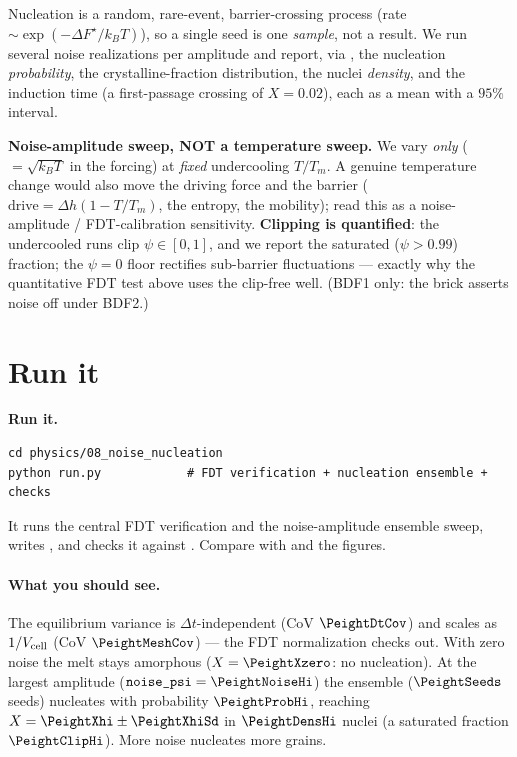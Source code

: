 Nucleation is a random, rare-event, barrier-crossing process (rate
$\sim\exp(-\Delta F^\star/k_BT)$), so a single seed is one \emph{sample},
not a result. We run several noise realizations per amplitude and report,
via , the nucleation
\emph{probability}, the crystalline-fraction distribution, the nuclei
\emph{density}, and the induction time (a first-passage crossing of
$X=0.02$), each as a mean with a $95\%$ interval.

\begin{keybox}
\textbf{Noise-amplitude sweep, NOT a temperature sweep.} We vary
\emph{only}  ($=\sqrt{k_BT}$ in the forcing) at
\emph{fixed} undercooling $T/T_m$. A genuine temperature change would also
move the driving force and the barrier ($\text{drive}=\Delta h(1-T/T_m)$,
the entropy, the mobility); read this as a noise-amplitude / FDT-calibration
sensitivity. \textbf{Clipping is quantified}: the undercooled runs clip
$\psi\in[0,1]$, and we report the saturated ($\psi>0.99$) fraction; the
$\psi=0$ floor rectifies sub-barrier fluctuations --- exactly why the
quantitative FDT test above uses the clip-free well. (BDF1 only: the brick
asserts noise off under BDF2.)
\end{keybox}

\section{Run it}

\begin{runbox}
\textbf{Run it.}
\begin{lstlisting}
cd physics/08_noise_nucleation
python run.py            # FDT verification + nucleation ensemble + checks
\end{lstlisting}
It runs the central FDT verification and the noise-amplitude ensemble
sweep, writes , and checks it against
. Compare with  and the figures.
\end{runbox}

\paragraph{What you should see.} The equilibrium variance is
$\Delta t$-independent (CoV $\ensuremath{\PeightDtCov}$) and scales as
$1/V_{\rm cell}$ (CoV $\ensuremath{\PeightMeshCov}$) --- the FDT
normalization checks out. With zero noise the melt stays amorphous
($X=\ensuremath{\PeightXzero}$: no nucleation). At the largest amplitude
($\texttt{noise\_psi}=\ensuremath{\PeightNoiseHi}$) the ensemble
($\ensuremath{\PeightSeeds}$ seeds) nucleates with probability
$\ensuremath{\PeightProbHi}$, reaching $X=\ensuremath{\PeightXhi}\pm
\ensuremath{\PeightXhiSd}$ in $\ensuremath{\PeightDensHi}$ nuclei (a
saturated fraction $\ensuremath{\PeightClipHi}$). More noise nucleates more
grains.

